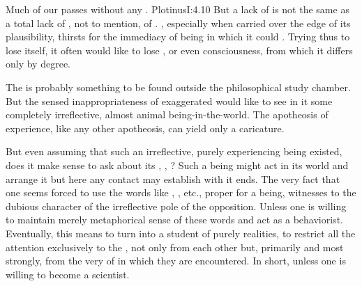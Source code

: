 
\pa Much of our  passes without any .  \citet{And even in our conscious life we can point to many noble
activities, of mind and of hand alike, which at the time in no way
compel our consciousness. A reader will often be quite unconscious
when he is most intent: in a feat of courage there can be no sense
either of the brave action or of the fact that all that is done
conforms to the rules of courage. And so in cases beyond number.}
{Plotinus}{I:4.10}  
%
But a lack of  is not the same as a total lack of
, not to mention, of . 
, especially when carried over the edge of
its plausibility, thirsts for the immediacy of being in which it
could . Trying thus to lose itself, it often would like to
lose , or even consciousness, from which it differs only by degree.


 The  is probably something to be  found outside the philosophical study
chamber. But the sensed inappropriateness of exaggerated  would
like to see in it some completely irreflective, almost animal 
being-in-the-world. The apotheosis of experience, like any other apotheosis,
can yield only a caricature.

But even assuming that such an irreflective, purely experiencing being existed,
does it make sense to ask about its , ,
? Such a being might act in its world and arrange it but here any
contact  may establish with it ends. The very fact that one seems
forced to use the words like , , etc., proper for a
 being, witnesses to the dubious character of the irreflective
pole of the opposition. Unless one is willing to maintain merely metaphorical sense of
these words and act as a behaviorist. Eventually, this means to turn into a
student of purely  realities, to restrict all the attention
exclusively to the ,  not only from each other but,
primarily and most strongly, from the very  of  in which
they are encountered. In short, unless one is willing to become a scientist.

